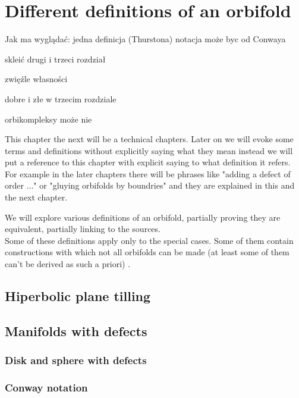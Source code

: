 \chapter{Different definitions of an orbifold}

Jak ma wyglądać:
jedna definicja (Thurstona)
notacja może byc od Conwaya

skleić drugi i trzeci rozdział

zwięźle własności


dobre i złe w trzecim rozdziale 

orbikompleksy może nie


This chapter the next will be a technical chapters. Later on we will evoke some terms and 
definitions without 
explicitly saying what they mean instead we will put a reference to this chapter with explicit 
saying to what definition it refers. \\
For example in the later chapters there will be phrases like "adding a defect of order $\dots$" or 
"gluying orbifolds by boundries" and they are explained in this and the next chapter.
 

We will explore various definitions of an orbifold, partially proving they are equivalent, partially 
linking to the sources. \\
Some of these definitions apply only to the special cases. Some of them contain constructions 
with which not all orbifolds can be made (at least some of them can't be derived as such a priori)
. \\

\section{Hiperbolic plane tilling}

\section{Manifolds with defects}
\subsection{Disk and sphere with defects}\label{Disk_and_sphere_with_defects}



\subsection{Conway notation}
\cite{Conway2008}

